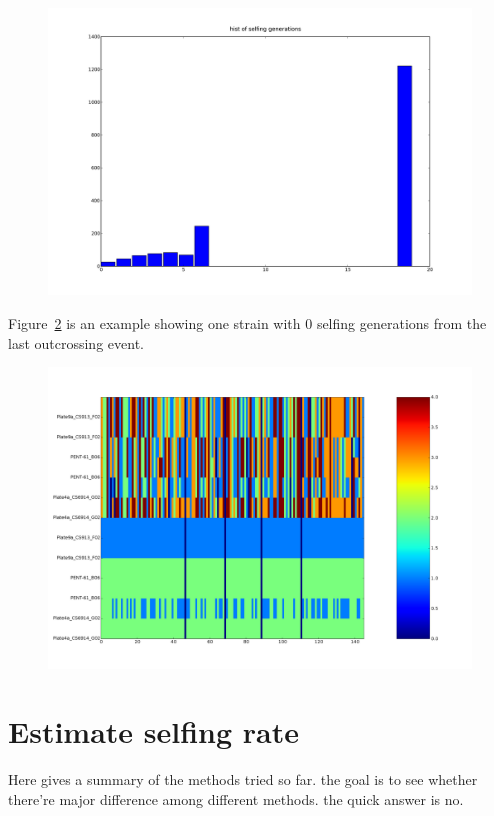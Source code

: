 \documentclass[a4paper,10pt]{article}
\begin{document}
\begin{figure}
\includegraphics[width=1\textwidth]{figures/justin_data_y_b_filtered_estimate_selfing_generation_hist.png}
\caption{}\label{f8}
\end{figure}

Figure~\ref{f9} is an example showing one strain with 0 selfing generations from the last outcrossing event.

\begin{figure}
\includegraphics[width=1\textwidth]{figures/trio1.png}
\caption{}\label{f9}
\end{figure}

\section{Estimate selfing rate}
Here gives a summary of the methods tried so far. the goal is to see whether there're major difference among different methods. the quick answer is no.
\end{document}
